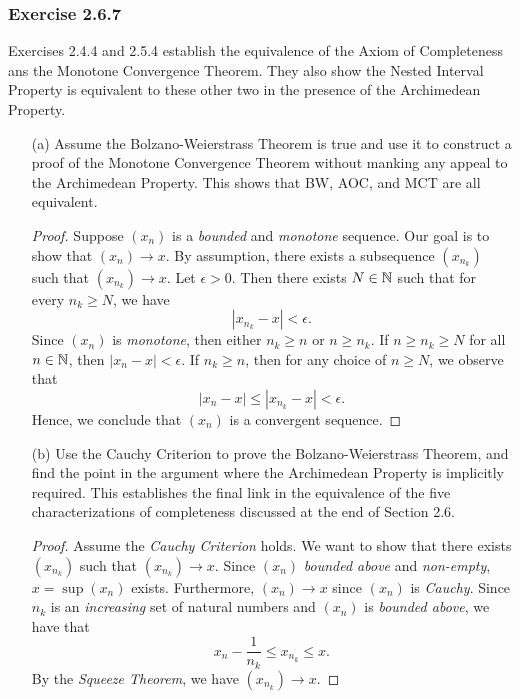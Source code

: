 \subsubsection{Exercise 2.6.7} Exercises 2.4.4 and 2.5.4 establish the equivalence of the Axiom of Completeness ans the Monotone Convergence Theorem. They also show the Nested Interval Property is equivalent to these other two in the presence of the Archimedean Property.
\begin{enumerate}
    \item[(a)] Assume the Bolzano-Weierstrass Theorem is true and use it to construct a proof of the Monotone Convergence Theorem without manking any appeal to the Archimedean Property. This shows that BW, AOC, and MCT are all equivalent. 
        \begin{proof}
            Suppose \((x_n)\) is a \textit{bounded} and \textit{monotone} sequence. Our goal is to show that \((x_n) \to x\). By assumption, there exists a subsequence \((x_{n_k})\) such that \( (x_{n_k}) \to x \). Let \( \epsilon > 0 \). Then there exists \( N \in \mathbb{N} \) such that for every \( n_k \geq N \), we have 
            \[ | x_{n_k} - x| < \epsilon.\]
        Since \((x_n)\) is \textit{monotone}, then either \( n_k \geq n \) or \( n \geq n_k \). If \(n \geq n_k \geq N  \) for all \( n \in \mathbb{N} \), then \( |x_n - x| < \epsilon \). If \( n_k \geq n \), then for any choice of \( n \geq N \), we observe that 
        \[ |x_n - x| \leq |x_{n_k} - x | < \epsilon.\]
        Hence, we conclude that \( (x_n)\) is a convergent sequence. 
        \end{proof}
    \item[(b)] Use the Cauchy Criterion to prove the Bolzano-Weierstrass Theorem, and find the point in the argument where the Archimedean Property is implicitly required. This establishes the final link in the equivalence of the five characterizations of completeness discussed at the end of Section 2.6. 
        \begin{proof}
            Assume the \textit{Cauchy Criterion} holds. We want to show that there exists \( (x_{n_k})\) such that \( (x_{n_k}) \to x \). Since \( (x_n)\) \textit{bounded above} and \textit{non-empty}, \( x = \sup (x_n)\) exists. Furthermore, \((x_n) \to x \) since \( (x_n)\) is \textit{Cauchy}. Since \(n_k\) is an \textit{increasing} set of natural numbers and \((x_n)\) is \textit{bounded above}, we have that
            \[ x_{n} - \frac{1}{n_k} \leq x_{n_k} \leq x. \]
        By the \textit{Squeeze Theorem}, we have \( (x_{n_k}) \to x\).
        \end{proof}
\end{enumerate}




